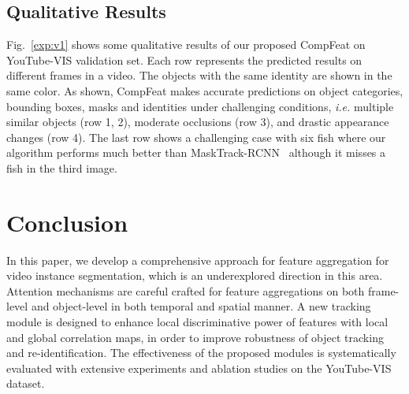 \documentclass[letterpaper]{article} \usepackage{aaai21}  \usepackage{times}  \usepackage{helvet} \usepackage{courier}  \usepackage[hyphens]{url}  \usepackage{graphicx} \urlstyle{rm} \def\UrlFont{\rm}  \usepackage{natbib}  \usepackage{caption} \frenchspacing  \setlength{\pdfpagewidth}{8.5in}  \setlength{\pdfpageheight}{11in}  \newcommand{\etal}{\emph{et al. }}
\newcommand{\ie}{\emph{i.e. }}
\begin{document}
\subsection{Qualitative Results}
Fig.~\ref{exp:v1} shows some qualitative results of our proposed CompFeat on YouTube-VIS validation set. Each row represents the predicted results on different frames in a video. The objects with the same identity are shown in the same color. As shown, CompFeat makes accurate predictions on object categories, bounding boxes, masks and identities under challenging conditions, \ie  multiple similar objects (row 1, 2), moderate occlusions (row 3), and drastic appearance changes (row 4).
The last row shows a challenging case with six fish where our algorithm performs much better than MaskTrack-RCNN~\cite{yang2019video} although it misses a fish in the third image. 


 \section{Conclusion}
In this paper, we develop a comprehensive approach for feature aggregation for video instance segmentation, which is an underexplored direction in this area.
Attention mechanisms are careful crafted for feature aggregations on both frame-level and object-level in both temporal and spatial manner.
A new tracking module is  designed to enhance local discriminative power of features with local and global correlation maps, in order to improve robustness of object tracking and re-identification. The effectiveness of the proposed modules is systematically evaluated with extensive experiments and ablation studies on the YouTube-VIS dataset.
%
 



\end{document}
